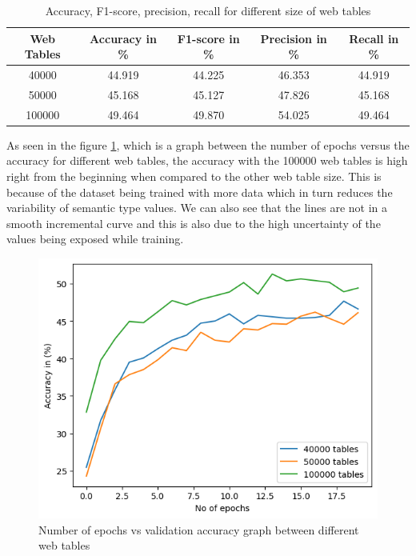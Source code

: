 \documentclass[12pt, a4paper]{report}
\theoremstyle{definition}
\numberwithin{equation}{chapter}
\numberwithin{figure}{chapter}
\numberwithin{table}{chapter}
\begin{document}
\begin{spacing}{1.5}
\begin{table}[H]
\centering
\begin{tabular}{ | c | c | c | c | c | } 
\hline
Web Tables & \textbf{Accuracy in \%} & \textbf{F1-score in \%} & \textbf{Precision in \%} & \textbf{Recall in \%} \\ [0.5ex]
\hline
40000& 44.919 & 44.225 & 46.353 & 44.919 \\ 
50000& 45.168 & 45.127 & 47.826 & 45.168 \\ 
100000& 49.464 & 49.870 & 54.025 & 49.464 \\
\hline
\end{tabular}
\caption{Accuracy, F1-score, precision, recall for different size of web tables \cite{wdc}}
\label{table:4}
\end{table}

\par
\setlength{\parindent}{0em}
\setlength{\parskip}{1em}
As seen in the figure \ref{fig:accweb}, which is a graph between the number of epochs versus the accuracy for different web tables, the accuracy with the 100000 web tables is high right from the beginning when compared to the other web table size. This is because of the dataset being trained with more data which in turn reduces the variability of semantic type values. We can also see that the lines are not in a smooth incremental curve and this is also due to the high uncertainty of the values being exposed while training. 

\begin{figure}[h]
    \centering
    \includegraphics[width=\textwidth]{./Pics/accuracy.png} 
    \caption{Number of epochs vs validation accuracy graph between different web tables}
    \label{fig:accweb}
\end{figure}

\end{spacing}
\end{document}
